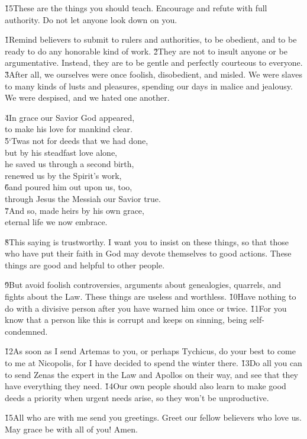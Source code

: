 \v{15}These are the things you should teach. Encourage and refute with full authority. Do not let anyone look down on you.

\v{1}Remind believers to submit to rulers and authorities, to be obedient, and to be ready to do any honorable kind of work. \v{2}They are not to insult anyone or be argumentative. Instead, they are to be gentle and perfectly courteous to everyone. \v{3}After all, we ourselves were once foolish, disobedient, and misled. We were slaves to many kinds of lusts and pleasures, spending our days in malice and jealousy. We were despised, and we hated one another.

\begin{poetry}
\poeml \v{4}In grace our Savior God appeared, \\
\poemll    to make his love for mankind clear. \\
\poeml \v{5}`Twas not for deeds that we had done, \\
\poemll    but by his steadfast love alone, \\
\poeml he saved us through a second birth, \\
\poemll    renewed us by the Spirit's work, \\
\poeml \v{6}and poured him out upon us, too, \\
\poemll    through Jesus the Messiah our Savior true. \\
\poeml \v{7}And so, made heirs by his own grace, \\
\poemll    eternal life we now embrace.
\end{poetry}

\v{8}This saying is trustworthy. I want you to insist on these things, so that those who have put their faith in God may devote themselves to good actions. These things are good and helpful to other people.

\v{9}But avoid foolish controversies, arguments about genealogies, quarrels, and fights about the Law. These things are useless and worthless. \v{10}Have nothing to do with a divisive person after you have warned him once or twice. \v{11}For you know that a person like this is corrupt and keeps on sinning, being self-condemned.

\v{12}As soon as I send Artemas to you, or perhaps Tychicus, do your best to come to me at Nicopolis, for I have decided to spend the winter there. \v{13}Do all you can to send Zenas the expert in the Law and Apollos on their way, and see that they have everything they need. \v{14}Our own people should also learn to make good deeds a priority when urgent needs arise, so they won't be unproductive.

\v{15}All who are with me send you greetings. Greet our fellow believers who love us. May grace be with all of you! Amen.
